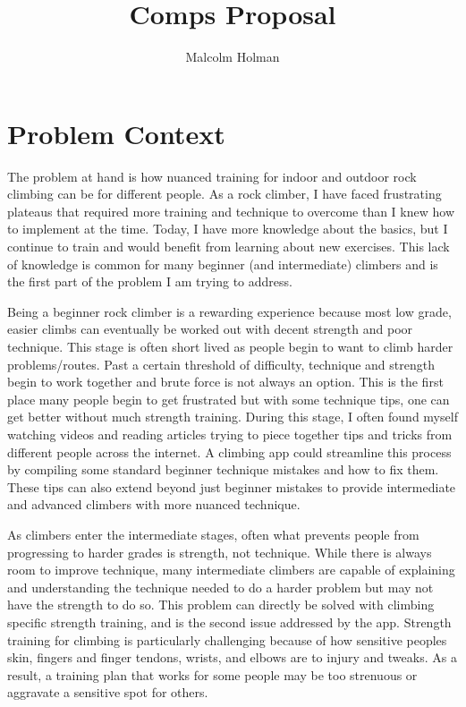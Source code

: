 \documentclass[10pt,twocolumn]{article}
\title{Comps Proposal}
\author{Malcolm Holman}
\affiliation{Occidental College}
\begin{document}
\maketitle

\section{Problem Context}

    The problem at hand is how nuanced training for indoor and outdoor rock climbing can be for different people. As a rock climber, I have faced frustrating plateaus that required more training and technique to overcome than I knew how to implement at the time. Today, I have more knowledge about the basics, but I continue to train and would benefit from learning about new exercises. This lack of knowledge is common for many beginner (and intermediate) climbers and is the first part of the problem I am trying to address. 

	Being a beginner rock climber is a rewarding experience because most low grade, easier climbs can eventually be worked out with decent strength and poor technique. This stage is often short lived as people begin to want to climb harder problems/routes. Past a certain threshold of difficulty, technique and strength begin to work together and brute force is not always an option. This is the first place many people begin to get frustrated but with some technique tips, one can get better without much strength training. During this stage, I often found myself watching videos and reading articles trying to piece together tips and tricks from different people across the internet. A climbing app could streamline this process by compiling some standard beginner technique mistakes and how to fix them. These tips can also extend beyond just beginner mistakes to provide intermediate and advanced climbers with more nuanced technique. 

	As climbers enter the intermediate stages, often what prevents people from progressing to harder grades is strength, not technique. While there is always room to improve technique, many intermediate climbers are capable of explaining and understanding the technique needed to do a harder problem but may not have the strength to do so. This problem can directly be solved with climbing specific strength training, and is the second issue addressed by the app. Strength training for climbing is particularly challenging because of how sensitive peoples skin, fingers and finger tendons, wrists, and elbows are to injury and tweaks. As a result, a training plan that works for some people may be too strenuous or aggravate a sensitive spot for others. 
	
\end{document}
